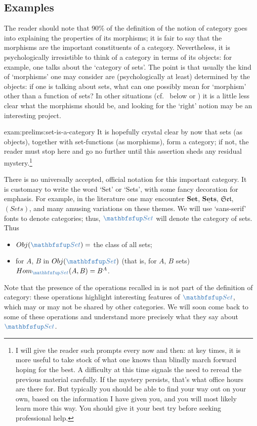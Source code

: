 \subsection{Examples}%
\label{subsec:prelims:examples}
The reader should note that 90\% of the definition of the notion of
category goes into explaining the properties of its morphisms; it is
fair to say that the morphisms are the important constituents of a
category. Nevertheless, it is psychologically irresistible to think of
a category in terms of its objects: for example, one talks about the
`category of sets'. The point is that usually the kind of `morphisms'
one may consider are (psychologically at least) determined by the
objects: if one is talking about sets, what can one possibly mean for
`morphism' other than a function of sets? In other situations (cf.\ 
 below or
) it is a little less clear what the
morphisms should be, and looking for the `right' notion may be an
interesting project.
\begin{exam}{}{exam:prelims:set-is-a-category}
  It is hopefully crystal clear by now that sets (as objects),
  together with set-functions (as morphisms), form a category; if not,
  the reader must stop here and go no further until this assertion
  sheds any residual mystery.\footnote{I will give the reader such
    prompts every now and then: at key times, it is more useful to
    take stock of what one knows than blindly march forward hoping for
    the best. A difficulty at this time signals the need to reread the
    previous material carefully. If the mystery persists, that's what
    office hours are there for. But typically you should be able to
    find your way out on your own, based on the information I have
    given you, and you will most likely learn more this way. You
    should give it your best try before seeking professional help.}

  There is no universally accepted, official notation for this
  important category. It is customary to write the word `Set' or
  `Sets', with some fancy decoration for emphasis. For example, in the
  literature one may encounter $\mathbf{Set}$,
  $\underline{\mathbf{Sets}}$, $\mathfrak{Set}$, $(Sets)$, and many
  amusing variations on these themes. We will use `sans-serif' fonts
  to denote categories; thus, $\categ{Set}$ will denote the category
  of sets. Thus
  \begin{itemize}
  \item $\Obj(\categ{Set}) = $ the class of all sets;
  \item for $A$, $B$ in $\Obj(\categ{Set})$ (that is, for $A$, $B$
    sets) $\Hom_{\categ{Set}}(A, B) = B^A$.
  \end{itemize}
  Note that the presence of the operations recalled in
  is not part of the definition of category: these operations
  highlight interesting features of $\categ{Set}$, which may or may
  not be shared by other categories. We will soon come back to some of
  these operations and understand more precisely what they say about
  $\categ{Set}$.
\end{exam}
